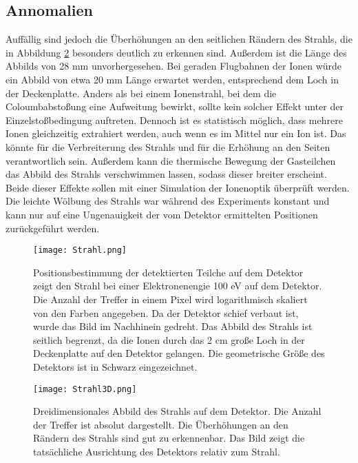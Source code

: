 \subsection{Annomalien}
\label{sec:Annomalien}
Auffällig sind jedoch die Überhöhungen an den seitlichen Rändern des Strahls, die in Abbildung \ref{fig:Strahl3D} besonders deutlich zu erkennen sind. Außerdem ist die Länge des Abbilds von 28 mm unvorhergesehen. Bei geraden Flugbahnen der Ionen würde ein Abbild von etwa 20 mm Länge erwartet werden, entsprechend dem Loch in der Deckenplatte. Anders als bei einem Ionenstrahl, bei dem die Coloumbabstoßung eine Aufweitung bewirkt, sollte kein solcher Effekt unter der Einzelstoßbedingung auftreten. Dennoch ist es statistisch möglich, dass mehrere Ionen gleichzeitig extrahiert werden, auch wenn es im Mittel nur ein Ion ist. Das könnte für die Verbreiterung des Strahls und für die Erhöhung an den Seiten verantwortlich sein. Außerdem kann die thermische Bewegung der Gasteilchen das Abbild des Strahls verschwimmen lassen, sodass dieser breiter erscheint. Beide dieser Effekte sollen mit einer Simulation der Ionenoptik überprüft werden. Die leichte Wölbung des Strahls war während des Experiments konstant und kann nur auf eine Ungenauigkeit der vom Detektor ermittelten Positionen zurückgeführt werden. 
\begin{figure}
    \centering
    \texttt{[image: Strahl.png]}
    \caption[Logarithmisches Abbild des Strahls auf dem Detektor]{Positionsbestimmung der detektierten Teilche auf dem Detektor zeigt den Strahl bei einer Elektronenengie 100 eV auf dem Detektor. Die Anzahl der Treffer in einem Pixel wird logarithmisch skaliert von den Farben angegeben. Da der Detektor schief verbaut ist, wurde das Bild im Nachhinein gedreht. Das Abbild des Strahls ist seitlich begrenzt, da die Ionen durch das 2 cm große Loch in der Deckenplatte auf den Detektor gelangen. Die geometrische Größe des Detektors ist in Schwarz eingezeichnet.}
    \label{fig:Strahl} 
\end{figure}

\begin{figure}
    \centering
    \texttt{[image: Strahl3D.png]}
    \caption[Dreidimensionales Abbild des Strahls auf dem Detektor]{Dreidimensionales Abbild des Strahls auf dem Detektor. Die Anzahl der Treffer ist absolut dargestellt. Die Überhöhungen an den Rändern des Strahls sind gut zu erkennenbar. Das Bild zeigt die tatsächliche Ausrichtung des Detektors relativ zum Strahl.}
    \label{fig:Strahl3D} 
\end{figure}

